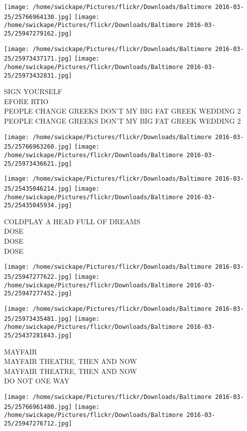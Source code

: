 \documentclass[10pt,letterpaper]{article}
\begin{document}
\texttt{[image: /home/swickape/Pictures/flickr/Downloads/Baltimore 2016-03-25/25766964130.jpg]}
\texttt{[image: /home/swickape/Pictures/flickr/Downloads/Baltimore 2016-03-25/25947279162.jpg]}

\texttt{[image: /home/swickape/Pictures/flickr/Downloads/Baltimore 2016-03-25/25973437171.jpg]}
\texttt{[image: /home/swickape/Pictures/flickr/Downloads/Baltimore 2016-03-25/25973432831.jpg]}

SIGN YOURSELF\\
EFORE RTIO\\
PEOPLE CHANGE GREEKS DON'T MY BIG FAT GREEK WEDDING 2\\
PEOPLE CHANGE GREEKS DON'T MY BIG FAT GREEK WEDDING 2
\pagebreak

\texttt{[image: /home/swickape/Pictures/flickr/Downloads/Baltimore 2016-03-25/25766963260.jpg]}
\texttt{[image: /home/swickape/Pictures/flickr/Downloads/Baltimore 2016-03-25/25973436621.jpg]}

\texttt{[image: /home/swickape/Pictures/flickr/Downloads/Baltimore 2016-03-25/25435046214.jpg]}
\texttt{[image: /home/swickape/Pictures/flickr/Downloads/Baltimore 2016-03-25/25435045934.jpg]}

COLDPLAY A HEAD FULL OF DREAMS\\
DOSE\\
DOSE\\
DOSE
\pagebreak

\texttt{[image: /home/swickape/Pictures/flickr/Downloads/Baltimore 2016-03-25/25947277622.jpg]}
\texttt{[image: /home/swickape/Pictures/flickr/Downloads/Baltimore 2016-03-25/25947277452.jpg]}

\texttt{[image: /home/swickape/Pictures/flickr/Downloads/Baltimore 2016-03-25/25973435481.jpg]}
\texttt{[image: /home/swickape/Pictures/flickr/Downloads/Baltimore 2016-03-25/25437281843.jpg]}

MAYFAIR\\
MAYFAIR THEATRE, THEN AND NOW\\
MAYFAIR THEATRE, THEN AND NOW\\
DO NOT ONE WAY
\pagebreak

\texttt{[image: /home/swickape/Pictures/flickr/Downloads/Baltimore 2016-03-25/25766961480.jpg]}
\texttt{[image: /home/swickape/Pictures/flickr/Downloads/Baltimore 2016-03-25/25947276712.jpg]}
\end{document}
